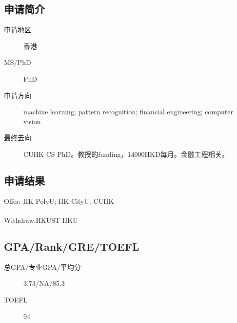 \documentclass[11pt,fleqn,openany]{book} %
\begin{document}
\noindent\begin{minipage}[t]{0.45\textwidth}
\subsection*{申请简介}
\begin{description}
\item[申请地区] 香港
\item[MS/PhD] PhD
\item[申请方向] machine learning; pattern recognition; financial engineering; computer vision
\item[最终去向] CUHK CS PhD。教授的funding，14000HKD每月。金融工程相关。
\end{description}
\end{minipage}
\hfill
\begin{minipage}[t]{0.45\textwidth}
\subsection*{申请结果}
\noindent Offer: HK PolyU; HK CityU; CUHK\\
\\
Withdraw:HKUST HKU
\end{minipage}
\subsection*{GPA/Rank/GRE/TOEFL}
\begin{description}
\item[总GPA/专业GPA/平均分] 3.73/NA/85.3
\item[TOEFL] 94
\end{description}
\end{document}
